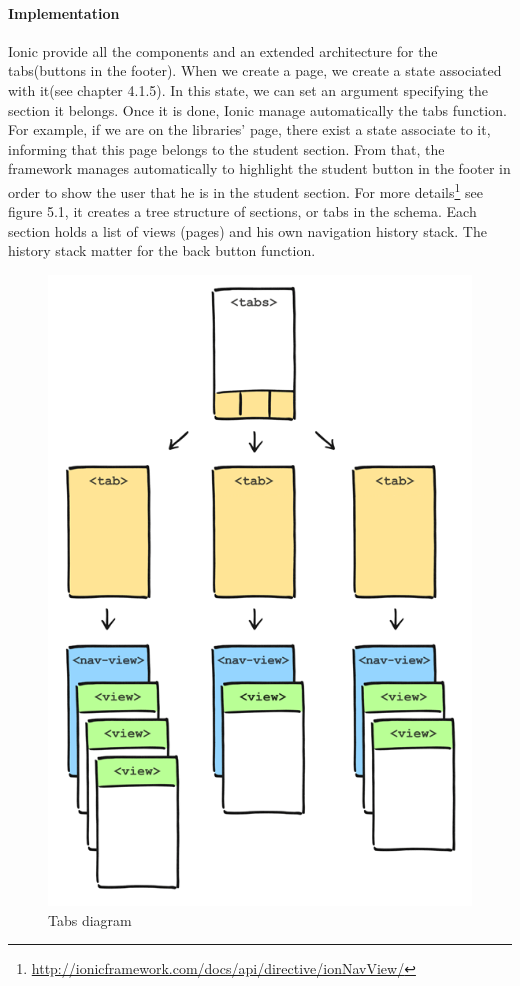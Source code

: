 \documentclass[11pt, a4paper]{report}
\begin{document}
\paragraph{Implementation}
Ionic provide all the components and an extended architecture for the tabs(buttons in the footer). When we create a page, we create a state associated with it(see chapter 4.1.5). In this state, we can set an argument specifying the section it belongs. Once it is done, Ionic manage automatically the tabs function. 
For example, if we are on the libraries’ page, there exist a state associate to it, informing that this page belongs to the student section. From that, the framework manages automatically to highlight the student button in the footer in order to show the user that he is in the student section.
For more details\footnote{\url{http://ionicframework.com/docs/api/directive/ionNavView/}} see figure 5.1, it creates a tree structure of sections, or tabs in the schema. Each section holds a list of views (pages) and his own navigation history stack. The history stack matter for the back button function. 
\begin{figure}
\centering
\includegraphics[scale = 0.3]{Images/tabs-nav-stack.png}
\caption{Tabs diagram}
\end{figure}
\end{document}
